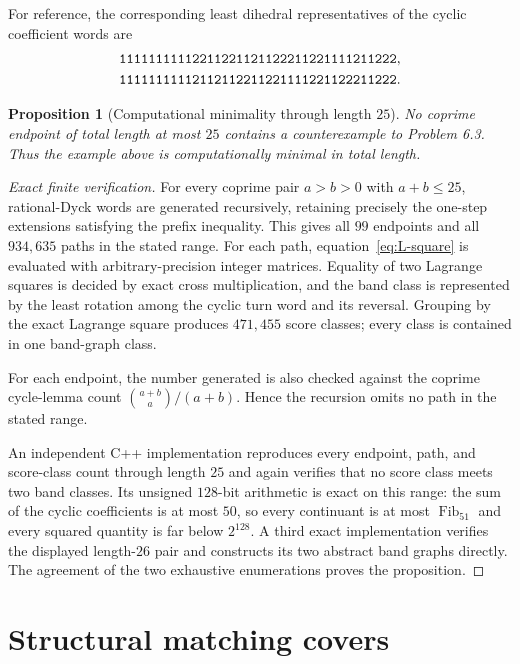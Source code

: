 \documentclass[11pt]{amsart}
\newtheorem{proposition}[theorem]{Proposition}
\theoremstyle{definition}
\newcommand{\Fib}{\operatorname{Fib}}
\begin{document}
For reference, the corresponding least dihedral representatives of the cyclic
coefficient words are
\begin{align*}
 &{\tt 11111111112211221121122211221111211222},\\
 &{\tt 11111111112112112211221111221122211222}.
\end{align*}

\begin{proposition}[Computational minimality through length $25$]
\label{prop:minimal}
No coprime endpoint of total length at most $25$ contains a counterexample to
Problem 6.3.  Thus the example above is computationally minimal in total
length.
\end{proposition}

\begin{proof}[Exact finite verification]
For every coprime pair $a>b>0$ with $a+b\leq25$, rational-Dyck words are
generated recursively, retaining precisely the one-step extensions satisfying
the prefix inequality.  This gives all $99$ endpoints and all $934{,}635$
paths in the stated range.  For each path, equation~\eqref{eq:L-square} is
evaluated with arbitrary-precision integer matrices.  Equality of two
Lagrange squares is decided by exact cross multiplication, and the band class
is represented by the least rotation among the cyclic turn word and its
reversal.  Grouping by the exact Lagrange square produces $471{,}455$ score
classes; every class is contained in one band-graph class.

For each endpoint, the number generated is also checked against the coprime
cycle-lemma count $\binom{a+b}{a}/(a+b)$.  Hence the recursion omits no path in
the stated range.

An independent C++ implementation reproduces every endpoint, path, and
score-class count through length $25$ and again verifies that no score class
meets two band classes.  Its unsigned $128$-bit arithmetic is exact on this
range: the sum of the cyclic coefficients is at most $50$, so every continuant
is at most $\Fib_{51}$ and every squared quantity is far below $2^{128}$.  A
third exact implementation verifies the displayed length-$26$ pair and
constructs its two abstract band graphs directly.  The agreement of the two
exhaustive enumerations proves the proposition.
\end{proof}

\section{Structural matching covers}\label{sec:matching-structure}
\end{document}
